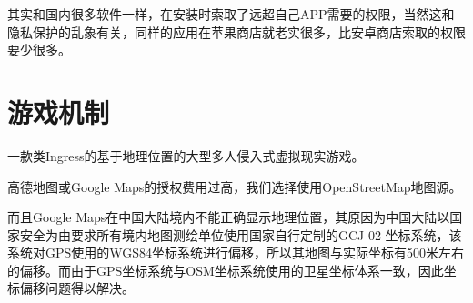 \documentclass[UTF8]{ctexart}
\begin{document}
其实和国内很多软件一样，在安装时索取了远超自己APP需要的权限，当然这和隐私保护的乱象有关，同样的应用在苹果商店就老实很多，比安卓商店索取的权限要少很多。

\section{游戏机制}

一款类Ingress的基于地理位置的大型多人侵入式虚拟现实游戏。

高德地图或Google Maps的授权费用过高，我们选择使用OpenStreetMap地图源。

而且Google Maps在中国大陆境内不能正确显示地理位置，其原因为中国大陆以国家安全为由要求所有境内地图测绘单位使用国家自行定制的GCJ-02 坐标系统，该系统对GPS使用的WGS84坐标系统进行偏移，所以其地图与实际坐标有500米左右的偏移。而由于GPS坐标系统与OSM坐标系统使用的卫星坐标体系一致，因此坐标偏移问题得以解决。
\end{document}
